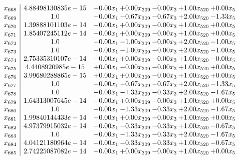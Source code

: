 \documentclass[8pt]{article}
\begin{document}
\[\begin{array}{c| c c@{\hskip 2pt} c@{\hskip 2pt} c@{\hskip 2pt} c@{\hskip 2pt} c@{\hskip 2pt} }
 x_{668}   &  4.88498130835e-15 & -0.00 x_{1} & +  0.00 x_{309} & -0.00 x_{3} & +  1.00 x_{520} & +  0.00 x_{5}\\
 x_{669}   &  1.0 & -0.00 x_{1} & -0.67 x_{309} & -0.67 x_{3} & +  2.00 x_{520} & -1.33 x_{5}\\
 x_{670}   &  1.39888101103e-14 & -0.00 x_{1} & +  0.00 x_{309} & -0.00 x_{3} & +  1.00 x_{520} & +  0.00 x_{5}\\
 x_{671}   &  1.85407245112e-14 & -0.00 x_{1} & +  0.00 x_{309} & -0.00 x_{3} & +  1.00 x_{520} & +  0.00 x_{5}\\
 x_{672}   &  1.0 & -0.00 x_{1} & -1.00 x_{309} & -0.00 x_{3} & +  2.00 x_{520} & -1.00 x_{5}\\
 x_{673}   &  1.0 & -0.00 x_{1} & -1.00 x_{309} & -0.00 x_{3} & +  2.00 x_{520} & -1.00 x_{5}\\
 x_{674}   &  2.75335310107e-14 & -0.00 x_{1} & +  0.00 x_{309} & -0.00 x_{3} & +  1.00 x_{520} & -0.00 x_{5}\\
 x_{675}   &  4.4408920985e-15 & +  0.00 x_{1} & -0.00 x_{309} & -0.00 x_{3} & +  1.00 x_{520} & +  0.00 x_{5}\\
 x_{676}   &  3.99680288865e-15 & +  0.00 x_{1} & +  0.00 x_{309} & -0.00 x_{3} & +  1.00 x_{520} & +  0.00 x_{5}\\
 x_{677}   &  1.0 & -0.00 x_{1} & -0.67 x_{309} & -0.67 x_{3} & +  2.00 x_{520} & -1.33 x_{5}\\
 x_{678}   &  1.0 & -0.00 x_{1} & -1.33 x_{309} & -0.33 x_{3} & +  2.00 x_{520} & -1.67 x_{5}\\
 x_{679}   &  1.64313007645e-14 & -0.00 x_{1} & +  0.00 x_{309} & -0.00 x_{3} & +  1.00 x_{520} & +  0.00 x_{5}\\
 x_{680}   &  1.0 & -0.00 x_{1} & -1.33 x_{309} & -0.33 x_{3} & +  2.00 x_{520} & -1.67 x_{5}\\
 x_{681}   &  1.99840144433e-14 & -0.00 x_{1} & +  0.00 x_{309} & -0.00 x_{3} & +  1.00 x_{520} & +  0.00 x_{5}\\
 x_{682}   &  4.97379915032e-14 & -0.00 x_{1} & -0.33 x_{309} & -0.33 x_{3} & +  1.00 x_{520} & -0.67 x_{5}\\
 x_{683}   &  1.0 & -0.00 x_{1} & -1.33 x_{309} & -0.33 x_{3} & +  2.00 x_{520} & -1.67 x_{5}\\
 x_{684}   &  4.04121180964e-14 & -0.00 x_{1} & -0.33 x_{309} & -0.33 x_{3} & +  1.00 x_{520} & -0.67 x_{5}\\
 x_{685}   &  2.74225087082e-14 & -0.00 x_{1} & +  0.00 x_{309} & -0.00 x_{3} & +  1.00 x_{520} & +  0.00 x_{5}\\

\end{array}\]
\end{document}

